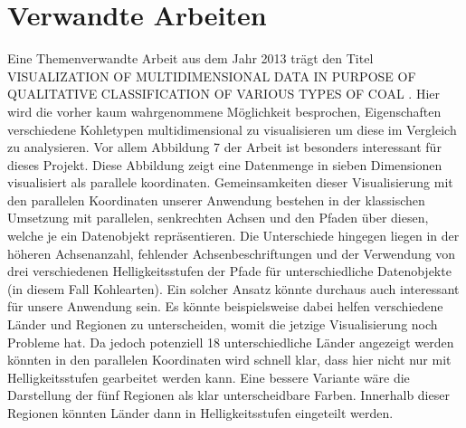 \documentclass[usegeometry=true]{scrartcl}
\begin{document}
\section{Verwandte Arbeiten}
Eine Themenverwandte Arbeit aus dem Jahr 2013 trägt den Titel \glqq VISUALIZATION OF MULTIDIMENSIONAL DATA IN PURPOSE OF QUALITATIVE CLASSIFICATION OF VARIOUS TYPES OF COAL\grqq{} \cite{Munzner2008}. Hier wird die vorher kaum wahrgenommene Möglichkeit besprochen, Eigenschaften verschiedene Kohletypen multidimensional zu visualisieren um diese im Vergleich zu analysieren. Vor allem Abbildung 7 der Arbeit ist besonders interessant für dieses Projekt. Diese Abbildung zeigt eine Datenmenge in sieben Dimensionen visualisiert als parallele koordinaten. Gemeinsamkeiten dieser Visualisierung mit den parallelen Koordinaten unserer Anwendung bestehen in der klassischen Umsetzung mit parallelen, senkrechten Achsen und den Pfaden über diesen, welche je ein Datenobjekt repräsentieren. Die Unterschiede hingegen liegen in der höheren Achsenanzahl, fehlender Achsenbeschriftungen und der Verwendung von drei verschiedenen Helligkeitsstufen der Pfade für unterschiedliche Datenobjekte (in diesem Fall Kohlearten). Ein solcher Ansatz könnte durchaus auch interessant für unsere Anwendung sein. Es könnte beispielsweise dabei helfen verschiedene Länder und Regionen zu unterscheiden, womit die jetzige Visualisierung noch Probleme hat. Da jedoch potenziell 18 unterschiedliche Länder angezeigt werden könnten in den parallelen Koordinaten wird schnell klar, dass hier nicht nur mit Helligkeitsstufen gearbeitet werden kann. Eine bessere Variante wäre die Darstellung der fünf Regionen als klar unterscheidbare Farben. Innerhalb dieser Regionen könnten Länder dann in Helligkeitsstufen eingeteilt werden.\\
\end{document}
